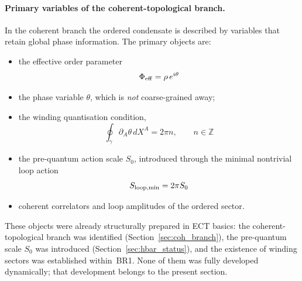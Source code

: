 \documentclass[11pt,a4paper]{article}
\numberwithin{equation}{section}
\begin{document}
\paragraph{Primary variables of the coherent-topological branch.}
In the coherent branch the ordered condensate is described by
variables that retain global phase information.
The primary objects are:
\begin{itemize}
  \item the effective order parameter
    \begin{equation}
      \Phi_{\rm eff} = \rho\,e^{i\theta}
      \label{eq:qs_order_parameter}
    \end{equation}
  \item the phase variable $\theta$, which is \emph{not}
    coarse-grained away;
  \item the winding quantisation condition,
    \begin{equation}
      \oint_\gamma \partial_A\theta\,dX^A = 2\pi n,
      \qquad n\in\mathbb{Z}
      \label{eq:qs_winding}
    \end{equation}
  \item the pre-quantum action scale $S_0$, introduced through
    the minimal nontrivial loop action
    \begin{equation}
      S_{\rm loop,min} = 2\pi S_0
      \label{eq:qs_Sloop}
    \end{equation}
  \item coherent correlators and loop amplitudes of the ordered sector.
\end{itemize}
These objects were already structurally prepared in ECT basics:
the coherent-topological branch was identified
(Section~\ref{sec:coh_branch}), the pre-quantum scale $S_0$ was
introduced (Section~\ref{sec:hbar_status}), and the existence
of winding sectors was established within~BR1.
None of them was fully developed dynamically; that development
belongs to the present section.
\end{document}
